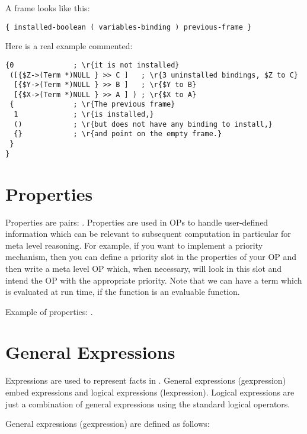 A frame looks like this:
\begin{verbatim}
{ installed-boolean ( variables-binding ) previous-frame }
\end{verbatim}

Here is a real example commented:

\begin{verbatim}
{0              ; \r{it is not installed}
 ([{$Z->(Term *)NULL } >> C ]   ; \r{3 uninstalled bindings, $Z to C}
  [{$Y->(Term *)NULL } >> B ]   ; \r{$Y to B}
  [{$X->(Term *)NULL } >> A ] ) ; \r{$X to A}
 {              ; \r{The previous frame}
  1             ; \r{is installed,}
  ()            ; \r{but does not have any binding to install,}
  {}            ; \r{and point on the empty frame.}
 }
}
\end{verbatim}

\section{Properties}

Properties are pairs: . Properties are used in OPs to handle
user-defined information which can be relevant to subsequent computation in
particular for meta level reasoning. For example, if you want to implement a
priority mechanism, then you can define a priority slot in the properties of
your OP and then write a meta level OP which, when necessary, will look in this
slot and intend the OP with the appropriate priority.  Note that we can have a
term which is evaluated at run time, if the function is an evaluable
function.

Example of properties: .

\section{General Expressions}

Expressions are used to represent facts in \COPRS{}.  General expressions
(gexpression) embed expressions and logical expressions (lexpression). Logical
expressions are just a combination of general expressions using the standard
logical operators.

General expressions (gexpression) are defined as follows:

\noindent
{} \*
 \*
 \*
 \*

